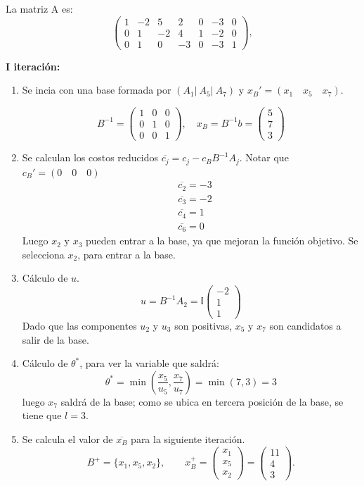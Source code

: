 La matriz A es:
\[
\begin{pmatrix}
    1 & -2 & 5 & 2 & 0 & -3 & 0 \\
    0 & 1 & -2 & 4 & 1 & -2 & 0 \\
    0 & 1 & 0 & -3 & 0 & -3 & 1
\end{pmatrix},
\]

\textbf{I iteración:}
\begin{enumerate}
    \item Se incia con una base formada por $(A_1|\: A_5 | \: A_7)$ y $x_B'=(x_1 \quad x_5 \quad x_7)$.

\[
B^{-1}=
\begin{pmatrix}
    1 & 0 & 0 \\ 0 & 1 & 0 \\ 0 & 0 & 1
\end{pmatrix}, \quad
x_B=B^{-1}b=\begin{pmatrix}
    5 \\ 7 \\ 3
\end{pmatrix}
\]

\item  Se calculan los costos reducidos $\overline{c_j} =c_j - c_B B^{-1} A_j$. Notar que $c_B'=(0\quad 0 \quad 0)$
\[
\begin{aligned}
    &\overline{c_2}=-3\\
    &\overline{c_3}=-2 \\
    &\overline{c_4}=1 \\
    &\overline{c_6}=0
\end{aligned}
\]
Luego $x_2$ y $x_3$ pueden entrar a la base, ya que mejoran la función objetivo. Se selecciona $x_2$, para entrar a la base.
\item Cálculo de $u$.
\[
u=B^{-1} A_2=\mathbb{I} \begin{pmatrix}
    -2 \\ 1 \\ 1
\end{pmatrix}
\]
Dado que las componentes $u_2$ y $u_3$ son positivas, $x_5$ y $x_7$ son candidatos a salir de la base.

\item Cálculo de $\theta^*$, para ver la variable que saldrá:
\[
\theta^*=\min\left( \frac{x_5}{u_5}, \frac{x_7}{u_7}\right)= \min(7,3)=3
\]
luego $x_7$ saldrá de la base; como se ubica en tercera posición de la base, se tiene que $l=3$.

\item  Se calcula el valor de $\overline{x_B}$ para la siguiente iteración.
\[
B^+=\{x_1,x_5,x_2\},
\qquad
x_B^+
=
\begin{pmatrix}
x_1\\
x_5\\
x_2
\end{pmatrix}
=
\begin{pmatrix}
11\\
4\\
3
\end{pmatrix}.
\]


\end{enumerate}
